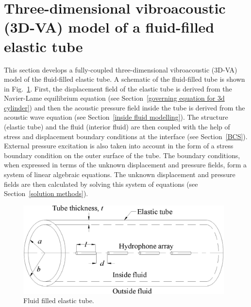 \documentclass[11pt,cleanfoot]{asme2ej}
\begin{document}

\section{Three-dimensional vibroacoustic (3D-VA) model of a fluid-filled elastic tube} \label{sec:vamodel}
This section develops a fully-coupled three-dimensional vibroacoustic (3D-VA) model of the fluid-filled elastic tube. A schematic of the fluid-filled tube is shown in Fig.~\ref{fig:fluid filled elastic tube}. First, the displacement field of the elastic tube is derived from the Navier-Lame equilibrium equation (see Section~\ref{governing equation for 3d cylinder}) and then the acoustic pressure field inside the tube is derived from the acoustic wave equation (see Section~\ref{inside fluid modelling}). The structure (elastic tube) and the fluid (interior fluid) are then coupled with the help of stress and displacement boundary conditions at the interface (see Section~\ref{BCS}). External pressure excitation is also taken into account in the form of a stress boundary condition on the outer surface of the tube. The boundary conditions, when expressed in terms of the unknown displacement and pressure fields, form a system of linear algebraic equations. The unknown displacement and pressure fields are then calculated by solving this system of equations (see Section~\ref{solution methods}).

\begin{figure}
    \centerline{
    \includegraphics[width=4.3in]{Sonar_array_element.eps}}
     \caption{Fluid filled elastic tube.}
    \label{fig:fluid filled elastic tube}
\end{figure}

\end{document}
